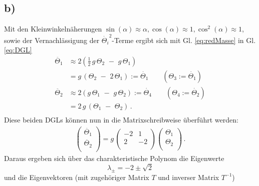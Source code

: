 \subsection*{b)}
Mit den Kleinwinkelnäherungen $\sin(\alpha) \approx \alpha, \cos(\alpha) \approx 1, \cos^2(\alpha) \approx 1$, sowie der Vernachlässigung der $\dot{\Theta_i}^2$-Terme ergibt sich mit Gl. \eqref{eq:redMasse} in Gl. \eqref{eq:DGL}
\begin{equation}
	\begin{split}
		\ddot{\Theta_1} &\approx 2 \left(\frac{1}{2}\,g\,\Theta_2\,\,-\,\,g\,\Theta_1\right) \\
						&= g\,(\Theta_2\,\,-\,\,2\,\Theta_1) := \dot{\Theta_1}\qquad(\Theta_3 := \dot{\Theta_1}) \\
		\ddot{\Theta_2} &\approx 2 \left(g\,\Theta_1\,\,-\,\,g\,\Theta_2\right) := \dot{\Theta_4} \qquad(\Theta_4 := \dot{\Theta_2}) \\
						&= 2\,g\,(\Theta_1\,\,-\,\,\Theta_2) \,. \\
	\end{split}
	\label{eq:DGLTheta}
\end{equation}
Diese beiden DGLs können nun in die Matrixschreibweise überführt werden:
\begin{equation*}
	\begin{split}
		\begin{pmatrix}
			\ddot{\Theta_1} \\
			\ddot{\Theta_2} \\
		\end{pmatrix}
		= g\,
		\begin{pmatrix}
			-2 & 1 \\
			2 & -2 \\
		\end{pmatrix}
		\begin{pmatrix}
			\Theta_1 \\
			\Theta_2 \\
		\end{pmatrix} \,.
	\end{split}
\end{equation*}
Daraus ergeben sich über das charakteristische Polynom die Eigenwerte
\begin{equation*}
 \lambda_{\pm} = -2 \pm \sqrt{2}
\end{equation*}
und die Eigenvektoren (mit zugehöriger Matrix $T$ und inverser Matrix $T^{-1}$)
